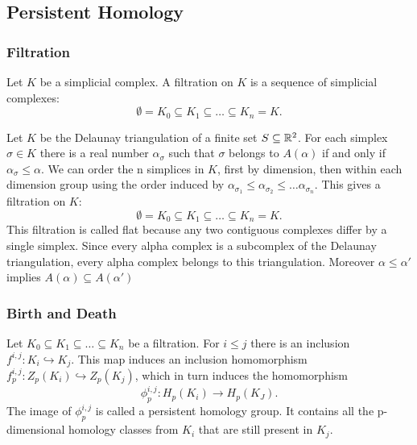 \subsection{Persistent Homology}


\subsubsection{Filtration}

\begin{definition}
    Let $K$ be a simplicial complex. A filtration on $K$ is a sequence of simplicial complexes:
    $$
    \emptyset = K_0 \subseteq K_1 \subseteq \ldots \subseteq K_n = K.
    $$
\end{definition}

\begin{example}
    Let $K$ be the Delaunay triangulation of a finite set $S \subseteq \mathbb{R}^2$. For each simplex $\sigma \in K$ there is a real number $\alpha_\sigma$ such that $\sigma$ belongs to $A(\alpha)$ if and only if $\alpha_\sigma \leq \alpha$. We can order the n simplices in $K$, first by dimension, then within each dimension group using the order induced by $\alpha_{\sigma_1} \leq \alpha_{\sigma_2} \leq \ldots \alpha_{\sigma_n}$. This gives a filtration on $K$:
    $$
    \emptyset = K_0 \subseteq K_1 \subseteq \ldots \subseteq K_n = K.
    $$
    This filtration is called flat because any two contiguous complexes differ by a single simplex. Since every alpha complex is a subcomplex of the Delaunay triangulation, every alpha complex belongs to this triangulation. Moreover $\alpha \leq \alpha'$ implies $A(\alpha) \subseteq A(\alpha')$
\end{example}


\subsubsection{Birth and Death}

Let $K_0 \subseteq K_1 \subseteq \ldots \subseteq K_n$ be a filtration. For $i \leq j$ there is an inclusion $f^{i, j}: K_i \hookrightarrow K_j$. This map induces an inclusion homomorphism $f_p^{i, j}: Z_p(K_i) \hookrightarrow Z_p(K_j)$, which in turn induces the homomorphism 
$$
\phi_p^{i, j}: H_p(K_i) \rightarrow H_p(K_J).
$$
The image of $\phi_p^{i, j}$ is called a persistent homology group. It contains all the p-dimensional homology classes from $K_i$ that are still present in $K_j$. 

